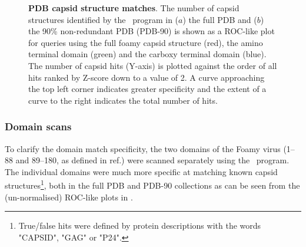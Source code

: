 % 
% 
%
 
\begin{figure}
\centering
{}
\begin{footnotesize}
\caption{
\label{iFig:rocs}
{\bf PDB capsid structure matches}.
The number of capsid structures identified by the \DALI\ program in ($a$) the full PDB and ($b$)
the 90\% non-redundant PDB (PDB-90) is shown as a ROC-like plot for queries using the full foamy capsid
structure (red), the amino terminal domain (green) and the carboxy terminal domain (blue). 
The number of capsid hits (Y-axis) is plotted against the order of all hits ranked by Z-score
down to a value of 2.   A curve approaching the top left corner indicates greater specificity 
and the extent of a curve to the right indicates the total number of hits.
}
\end{footnotesize}
\end{figure}

\subsubsection{Domain scans}

To clarify the domain match specificity, the two domains of the Foamy virus
(1--88 and 89--180, as defined in ref.\cite{TaylorWR99b}) were scanned separately using the \DALI\ program.  
The individual domains were much more specific at matching known capsid structures\footnote{
True/false hits were defined by protein descriptions with the words "CAPSID", "GAG" or "P24".
},   
both in the full PDB and PDB-90 collections as can be seen from the (un-normalised)
ROC-like plots in .

